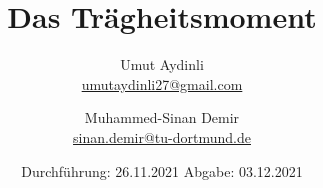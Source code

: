 

\subject{V101}
\title{Das Trägheitsmoment}
\author{Umut Aydinli \\
 \href{mailto:umutaydinli27@gmail.com}{umutaydinli27@gmail.com}
 \and Muhammed-Sinan Demir \\
 \href{mailto:sinan.demir@tu-dortmund.de}{sinan.demir@tu-dortmund.de}
 }
\date{
  Durchführung: 26.11.2021
  \hspace{3em}
  Abgabe: 03.12.2021
}




\maketitle
\tableofcontents
\newpage





\newpage





\nocite{*}
\printbibliography{}

